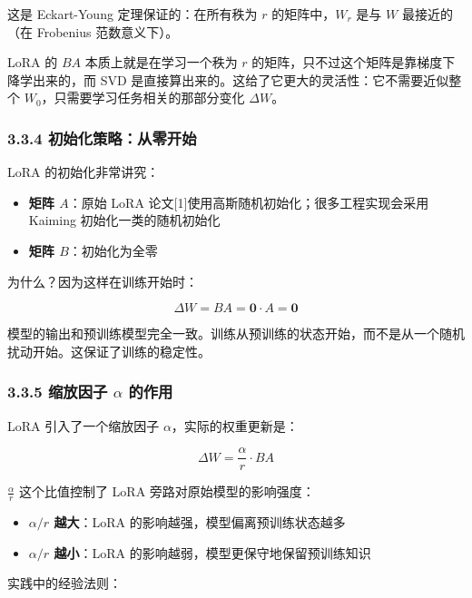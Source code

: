\documentclass[
  chinese,
]{ctexart}
\providecommand{\tightlist}{%
  \setlength{\itemsep}{0pt}\setlength{\parskip}{0pt}}
\begin{document}
这是 Eckart-Young 定理保证的：在所有秩为 \(r\) 的矩阵中，\(W_r\) 是与
\(W\) 最接近的（在 Frobenius 范数意义下）。

LoRA 的 \(BA\) 本质上就是在学习一个秩为 \(r\)
的矩阵，只不过这个矩阵是靠梯度下降学出来的，而 SVD
是直接算出来的。这给了它更大的灵活性：它不需要近似整个
\(W_0\)，只需要学习任务相关的那部分变化 \(\Delta W\)。

\subsubsection{3.3.4
初始化策略：从零开始}\label{ux521dux59cbux5316ux7b56ux7565ux4eceux96f6ux5f00ux59cb}

LoRA 的初始化非常讲究：

\begin{itemize}
\tightlist
\item
  \textbf{矩阵 \(A\)}：原始 LoRA
  论文{[}1{]}使用高斯随机初始化；很多工程实现会采用 Kaiming
  初始化一类的随机初始化
\item
  \textbf{矩阵 \(B\)}：初始化为全零
\end{itemize}

为什么？因为这样在训练开始时：

\[\Delta W = BA = \mathbf{0} \cdot A = \mathbf{0}\]

模型的输出和预训练模型完全一致。训练从预训练的状态开始，而不是从一个随机扰动开始。这保证了训练的稳定性。

\subsubsection{\texorpdfstring{3.3.5 缩放因子 \(\alpha\)
的作用}{3.3.5 缩放因子 \textbackslash alpha 的作用}}\label{ux7f29ux653eux56e0ux5b50-alpha-ux7684ux4f5cux7528}

LoRA 引入了一个缩放因子 \(\alpha\)，实际的权重更新是：

\[\Delta W = \frac{\alpha}{r} \cdot BA\]

\(\frac{\alpha}{r}\) 这个比值控制了 LoRA 旁路对原始模型的影响强度：

\begin{itemize}
\tightlist
\item
  \textbf{\(\alpha / r\) 越大}：LoRA 的影响越强，模型偏离预训练状态越多
\item
  \textbf{\(\alpha / r\) 越小}：LoRA
  的影响越弱，模型更保守地保留预训练知识
\end{itemize}

实践中的经验法则：
\end{document}
